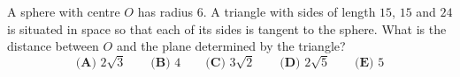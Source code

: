 A sphere with centre $O$ has radius $6$. A triangle with sides of length $15$, $15$ and $24$ is situated in space so that each of its sides is tangent to the sphere. What is the distance between $O$ and the plane determined by the triangle?
\[\textbf{(A) }2\sqrt3\qquad\textbf{(B) }4\qquad\textbf{(C) }3\sqrt2\qquad\textbf{(D) }2\sqrt5\qquad\textbf{(E) }5\]
